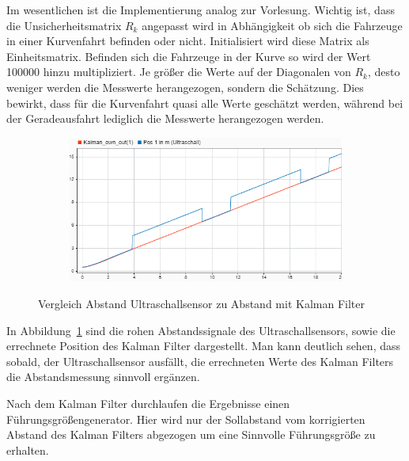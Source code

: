 Im wesentlichen ist die Implementierung analog zur Vorlesung. Wichtig ist, dass
die Unsicherheitsmatrix $R_k$ angepasst wird in Abhängigkeit ob sich die
Fahrzeuge in einer Kurvenfahrt befinden oder nicht. Initialisiert wird diese
Matrix als Einheitsmatrix. Befinden sich die Fahrzeuge in der Kurve so wird der
Wert 100000 hinzu multipliziert. Je größer die Werte auf der Diagonalen von
$R_k$, desto weniger werden die Messwerte herangezogen, sondern die Schätzung.
Dies bewirkt, dass für die Kurvenfahrt quasi alle Werte geschätzt werden,
während bei der Geradeausfahrt lediglich die Messwerte herangezogen werden.
\begin{figure}[hbt]
\centering
\begin{subfigure}{0.49\textwidth}
    \centering
    \includegraphics*[width=\textwidth]{figures/kalmanvgl.png}
\end{subfigure}
    \caption{Vergleich Abstand Ultraschallsensor zu Abstand mit Kalman Filter
    \label{fig:kalmanvgl}}
\end{figure}    
In Abbildung~\ref{fig:kalmanvgl} sind die rohen Abstandssignale des
Ultraschallsensors, sowie die errechnete Position des Kalman Filter dargestellt.
Man kann deutlich sehen, dass sobald, der Ultraschallsensor ausfällt, die
errechneten Werte des Kalman Filters die Abstandsmessung sinnvoll ergänzen.

Nach dem Kalman Filter durchlaufen die Ergebnisse einen Führungsgrößengenerator.
Hier wird nur der Sollabstand vom korrigierten Abstand des Kalman Filters
abgezogen um eine Sinnvolle Führungsgröße zu erhalten.

